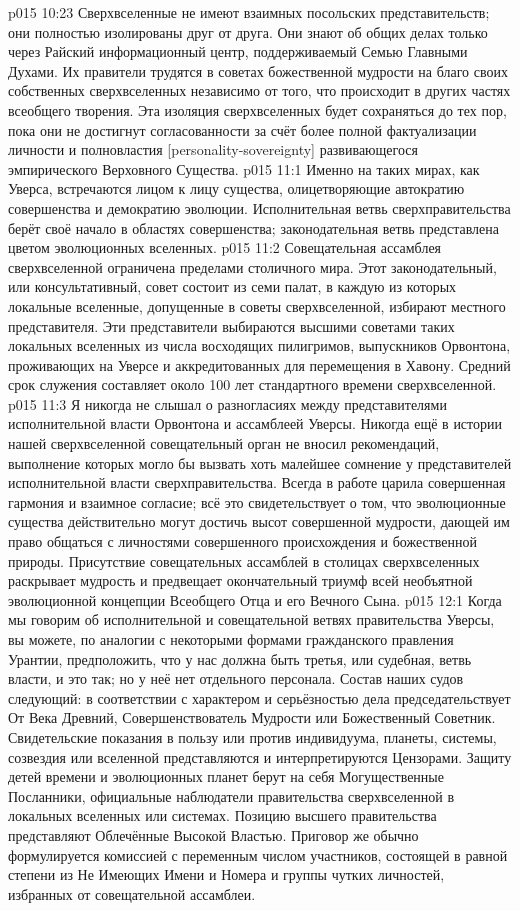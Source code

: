 \vs p015 10:23 Сверхвселенные не имеют взаимных посольских представительств; они полностью изолированы друг от друга. Они знают об общих делах только через Райский информационный центр, поддерживаемый Семью Главными Духами. Их правители трудятся в советах божественной мудрости на благо своих собственных сверхвселенных независимо от того, что происходит в других частях всеобщего творения. Эта изоляция сверхвселенных будет сохраняться до тех пор, пока они не достигнут согласованности за счёт более полной фактуализации личности и полновластия [personality\hyp{}sovereignty] развивающегося эмпирического Верховного Существа.
\vs p015 11:1 Именно на таких мирах, как Уверса, встречаются лицом к лицу существа, олицетворяющие автократию совершенства и демократию эволюции. Исполнительная ветвь сверхправительства берёт своё начало в областях совершенства; законодательная ветвь представлена цветом эволюционных вселенных.
\vs p015 11:2 Совещательная ассамблея сверхвселенной ограничена пределами столичного мира. Этот законодательный, или консультативный, совет состоит из семи палат, в каждую из которых локальные вселенные, допущенные в советы сверхвселенной, избирают местного представителя. Эти представители выбираются высшими советами таких локальных вселенных из числа восходящих пилигримов, выпускников Орвонтона, проживающих на Уверсе и аккредитованных для перемещения в Хавону. Средний срок служения составляет около 100 лет стандартного времени сверхвселенной.
\vs p015 11:3 Я никогда не слышал о разногласиях между представителями исполнительной власти Орвонтона и ассамблеей Уверсы. Никогда ещё в истории нашей сверхвселенной совещательный орган не вносил рекомендаций, выполнение которых могло бы вызвать хоть малейшее сомнение у представителей исполнительной власти сверхправительства. Всегда в работе царила совершенная гармония и взаимное согласие; всё это свидетельствует о том, что эволюционные существа действительно могут достичь высот совершенной мудрости, дающей им право общаться с личностями совершенного происхождения и божественной природы. Присутствие совещательных ассамблей в столицах сверхвселенных раскрывает мудрость и предвещает окончательный триумф всей необъятной эволюционной концепции Всеобщего Отца и его Вечного Сына.
\vs p015 12:1 Когда мы говорим об исполнительной и совещательной ветвях правительства Уверсы, вы можете, по аналогии с некоторыми формами гражданского правления Урантии, предположить, что у нас должна быть третья, или судебная, ветвь власти, и это так; но у неё нет отдельного персонала. Состав наших судов следующий: в соответствии с характером и серьёзностью дела председательствует От Века Древний, Совершенствователь Мудрости или Божественный Советник. Свидетельские показания в пользу или против индивидуума, планеты, системы, созвездия или вселенной представляются и интерпретируются Цензорами. Защиту детей времени и эволюционных планет берут на себя Могущественные Посланники, официальные наблюдатели правительства сверхвселенной в локальных вселенных или системах. Позицию высшего правительства представляют Облечённые Высокой Властью. Приговор же обычно формулируется комиссией с переменным числом участников, состоящей в равной степени из Не Имеющих Имени и Номера и группы чутких личностей, избранных от совещательной ассамблеи.

